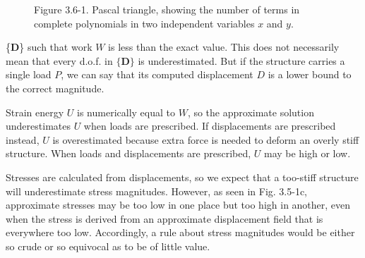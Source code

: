 \documentclass[10pt]{article}
\begin{document}
\begin{figure}[htbp]
\begin{center}
\captionsetup{labelformat=empty}
\caption{Figure 3.6-1. Pascal triangle, showing the number of terms in complete polynomials in two independent variables $x$ and $y$.}
\end{center}
\end{figure}

\{\textbf{D}\} such that work $W$ is less than the exact value. This does not necessarily mean that every d.o.f. in $\{\mathbf{D}\}$ is underestimated. But if the structure carries a single load $P$, we can say that its computed displacement $D$ is a lower bound to the correct magnitude.

Strain energy $U$ is numerically equal to $W$, so the approximate solution underestimates $U$ when loads are prescribed. If displacements are prescribed instead, $U$ is overestimated because extra force is needed to deform an overly stiff structure. When loads and displacements are prescribed, $U$ may be high or low.

Stresses are calculated from displacements, so we expect that a too-stiff structure will underestimate stress magnitudes. However, as seen in Fig. 3.5-1c, approximate stresses may be too low in one place but too high in another, even when the stress is derived from an approximate displacement field that is everywhere too low. Accordingly, a rule about stress magnitudes would be either so crude or so equivocal as to be of little value.
\end{document}

